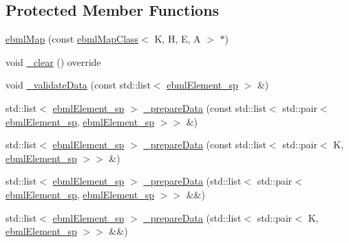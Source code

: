 \subsection*{Protected Member Functions}
\begin{DoxyCompactItemize}
\item 
\mbox{\hyperlink{classebml_1_1ebmlMap_ae96480e040d7541d32abddde92ab2b49}{ebml\+Map}} (const \mbox{\hyperlink{classebml_1_1ebmlMapClass}{ebml\+Map\+Class}}$<$ K, H, E, A $>$ $\ast$)
\item 
void \mbox{\hyperlink{classebml_1_1ebmlMap_a3aaf6a51c0e03d5050bdefc527f9776c}{\+\_\+clear}} () override
\item 
void \mbox{\hyperlink{classebml_1_1ebmlMap_ad3807a61a0aa3934eca4882a40e1bda9}{\+\_\+validate\+Data}} (const std\+::list$<$ \mbox{\hyperlink{namespaceebml_adad533b7705a16bb360fe56380c5e7be}{ebml\+Element\+\_\+sp}} $>$ \&)
\item 
std\+::list$<$ \mbox{\hyperlink{namespaceebml_adad533b7705a16bb360fe56380c5e7be}{ebml\+Element\+\_\+sp}} $>$ \mbox{\hyperlink{classebml_1_1ebmlMap_a7a57cf320540396c8010845aeae6db19}{\+\_\+prepare\+Data}} (const std\+::list$<$ std\+::pair$<$ \mbox{\hyperlink{namespaceebml_adad533b7705a16bb360fe56380c5e7be}{ebml\+Element\+\_\+sp}}, \mbox{\hyperlink{namespaceebml_adad533b7705a16bb360fe56380c5e7be}{ebml\+Element\+\_\+sp}} $>$$>$ \&)
\item 
std\+::list$<$ \mbox{\hyperlink{namespaceebml_adad533b7705a16bb360fe56380c5e7be}{ebml\+Element\+\_\+sp}} $>$ \mbox{\hyperlink{classebml_1_1ebmlMap_a52dfd52eeeb589a90de98b7aad3beeef}{\+\_\+prepare\+Data}} (const std\+::list$<$ std\+::pair$<$ K, \mbox{\hyperlink{namespaceebml_adad533b7705a16bb360fe56380c5e7be}{ebml\+Element\+\_\+sp}} $>$$>$ \&)
\item 
std\+::list$<$ \mbox{\hyperlink{namespaceebml_adad533b7705a16bb360fe56380c5e7be}{ebml\+Element\+\_\+sp}} $>$ \mbox{\hyperlink{classebml_1_1ebmlMap_ad9cbd0499431f6dbe19bcc022624d61f}{\+\_\+prepare\+Data}} (std\+::list$<$ std\+::pair$<$ \mbox{\hyperlink{namespaceebml_adad533b7705a16bb360fe56380c5e7be}{ebml\+Element\+\_\+sp}}, \mbox{\hyperlink{namespaceebml_adad533b7705a16bb360fe56380c5e7be}{ebml\+Element\+\_\+sp}} $>$$>$ \&\&)
\item 
std\+::list$<$ \mbox{\hyperlink{namespaceebml_adad533b7705a16bb360fe56380c5e7be}{ebml\+Element\+\_\+sp}} $>$ \mbox{\hyperlink{classebml_1_1ebmlMap_ad061162f3c9e15b0b93af5e557beca6e}{\+\_\+prepare\+Data}} (std\+::list$<$ std\+::pair$<$ K, \mbox{\hyperlink{namespaceebml_adad533b7705a16bb360fe56380c5e7be}{ebml\+Element\+\_\+sp}} $>$$>$ \&\&)

\end{DoxyCompactItemize}

